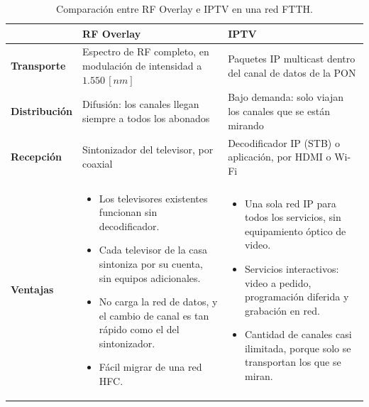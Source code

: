 \begin{table}[H]
    \centering
    \small
    \caption{Comparación entre RF Overlay e IPTV en una red FTTH.}
    \label{tab:overlay_iptv}
    \renewcommand{\arraystretch}{1.2}
    \begin{tabular}{p{2.6cm} >{\raggedright\arraybackslash}p{5.9cm} >{\raggedright\arraybackslash}p{5.9cm}}
        \toprule
          & \textbf{RF Overlay} & \textbf{IPTV} \\
        \midrule
        \textbf{Transporte} & Espectro de RF completo, en modulación de intensidad a $1.550 \, [nm]$ & Paquetes IP multicast dentro del canal de datos de la PON \\
        \midrule
        \textbf{Distribución} & Difusión: los canales llegan siempre a todos los abonados & Bajo demanda: solo viajan los canales que se están mirando \\
        \midrule
        \textbf{Recepción} & Sintonizador del televisor, por coaxial & Decodificador IP (STB) o aplicación, por HDMI o Wi-Fi \\
        \midrule
        \textbf{Ventajas} &
        \begin{itemize}[nosep, leftmargin=*, before=\vspace{-0.6\baselineskip}, after=\vspace{-\baselineskip}]
            \item Los televisores existentes funcionan sin decodificador.
            \item Cada televisor de la casa sintoniza por su cuenta, sin equipos adicionales.
            \item No carga la red de datos, y el cambio de canal es tan rápido como el del sintonizador.
            \item Fácil migrar de una red HFC.
        \end{itemize} &
        \begin{itemize}[nosep, leftmargin=*, before=\vspace{-0.6\baselineskip}, after=\vspace{-\baselineskip}]
            \item Una sola red IP para todos los servicios, sin equipamiento óptico de video.
            \item Servicios interactivos: video a pedido, programación diferida y grabación en red.
            \item Cantidad de canales casi ilimitada, porque solo se transportan los que se miran.
        \end{itemize} \\

\end{tabular}
\end{table}

